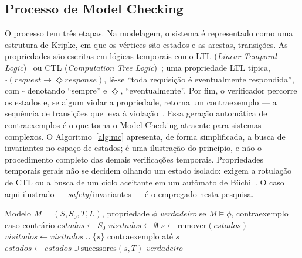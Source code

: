 \subsection{Processo de Model Checking}

O processo tem três etapas. Na modelagem, o sistema é representado como uma
estrutura de Kripke, em que os vértices são estados e as arestas, transições. As
propriedades são escritas em lógicas temporais como LTL (\textit{Linear Temporal
Logic})~\cite{Pnueli1977} ou CTL (\textit{Computation Tree Logic})~\cite{Clarke1986};
uma propriedade LTL típica, $\square(\textit{request} \rightarrow
\Diamond\textit{response})$, lê-se ``toda requisição é eventualmente
respondida'', com $\square$ denotando ``sempre'' e $\Diamond$, ``eventualmente''.
Por fim, o verificador percorre os estados e, se algum violar a propriedade,
retorna um contraexemplo --- a sequência de transições que leva à
violação~\cite{Clarke1986}. Essa geração automática de contraexemplos é o que
torna o Model Checking atraente para sistemas complexos.
O Algoritmo~\ref{alg:mc} apresenta, de forma simplificada, a busca de invariantes
no espaço de estados; é uma ilustração do princípio, e não o procedimento
completo das demais verificações temporais. Propriedades temporais gerais não se
decidem olhando um estado isolado: exigem a rotulação de CTL ou a busca de um
ciclo aceitante em um autômato de Büchi~\cite{Clarke1986}. O caso aqui ilustrado
--- \textit{safety}/invariantes --- é o empregado nesta pesquisa.

\begin{algorithm}
\caption{Algoritmo de verificação de invariantes por busca no espaço de estados}
\label{alg:mc}
\begin{algorithmic}[1]
\Require Modelo $M = (S, S_0, T, L)$, propriedade $\phi$
\Ensure \textit{verdadeiro} se $M \models \phi$, contraexemplo caso contrário
\State $estados \leftarrow S_0$
\State $visitados \leftarrow \emptyset$
    \State $s \leftarrow \text{remover}(estados)$
        \State $visitados \leftarrow visitados \cup \{s\}$
            \State \Return contraexemplo até $s$
        \EndIf
        \State $estados \leftarrow estados \cup \text{sucessores}(s, T)$
    \EndIf
\EndWhile
\State \Return \textit{verdadeiro}
\end{algorithmic}
\end{algorithm}

